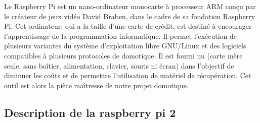 Le Raspberry Pi est un nano-ordinateur monocarte à processeur ARM conçu par le créateur de jeux vidéo David Braben, dans le cadre de sa fondation Raspberry Pi. Cet ordinateur, qui a la taille d'une carte de crédit, est destiné à encourager l'apprentissage de la programmation informatique. Il permet l'exécution de plusieurs variantes du système d'exploitation libre GNU/Linux et des logiciels compatibles à plusieurs protocoles de domotique. Il est fourni nu (carte mère seule, sans boîtier, alimentation, clavier, souris ni écran) dans l'objectif de diminuer les coûts et de permettre l'utilisation de matériel de récupération.
Cet outil est alors la pièce maîtresse de notre projet domotique. 
\clearpage
\subsection{Description de la raspberry pi 2}

